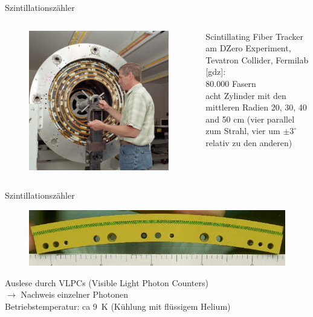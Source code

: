 \begin{frame}{Szintillationszähler}
\begin{columns}[T]
			\begin{figure}[htbp]
			  \centering
			  \includegraphics[scale=0.2]{bilder/beispiele/dzero-010}
			\end{figure}
		\hspace{1cm}
		\vspace{0.3cm}
Scintillating Fiber Tracker am DZero Experiment, Tevatron Collider, Fermilab [gdz]: \\
\vspace{0.5cm}
80.000 Fasern\\
 acht Zylinder mit den mittleren Radien 20, 30, 40 and 50 cm (vier parallel zum
Strahl, vier um $\pm3^\circ$ relativ zu den anderen)
    \end{columns}
\end{frame}

\begin{frame}{Szintillationszähler}

			\begin{figure}[htbp]
			  \centering
			  \includegraphics[scale=0.4]{bilder/beispiele/dzero-012}
			\end{figure}
		\hspace{1cm}

		\vspace{0.3cm}
Auslese durch VLPCs (Visible Light Photon Counters)\\ $\rightarrow$ Nachweis einzelner Photonen\\
Betriebstemperatur: ca 9~K (Kühlung mit flüssigem Helium)
\end{frame}

